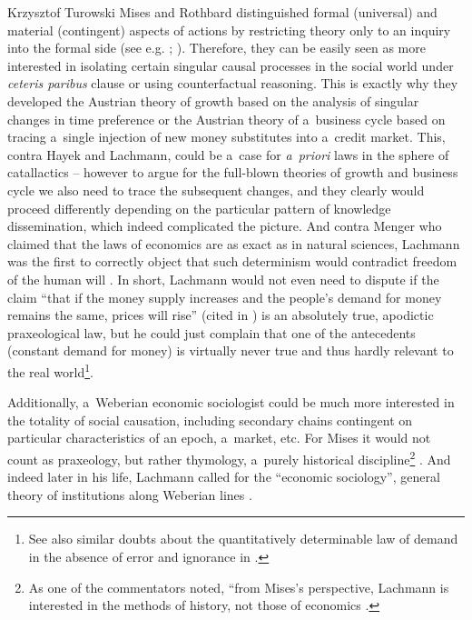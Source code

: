\begin{artengenv}{Krzysztof Turowski}
Mises and Rothbard distinguished formal (universal) and material (contingent) aspects of actions by restricting theory only to an inquiry into the formal side (see e.g. \cite[31--32]{mises-ha}; \cite[83]{rothbard-mes}). Therefore, they can be easily seen as more interested in isolating certain singular causal processes in the social world under \emph{ceteris paribus} clause or using counterfactual reasoning. This is exactly why they developed the Austrian theory of growth based on the analysis of singular changes in time preference or the Austrian theory of a~business cycle based on tracing a~single injection of new money substitutes into a~credit market.
This, contra Hayek and Lachmann, could be a~case for \emph{a~priori} laws in the sphere of catallactics -- however to argue for the full-blown theories of growth and business cycle we also need to trace the subsequent changes, and they clearly would proceed differently depending on the particular pattern of knowledge dissemination, which indeed complicated the picture.
And contra Menger who claimed that the laws of economics are as exact as in natural sciences, Lachmann was the first to correctly object that such determinism would contradict freedom of the human will \parencite[59]{lachmann-menger}.
In short, Lachmann would not even need to dispute if the claim ``that if the money supply increases and the people's demand for money remains the same, prices will rise'' (cited in \cite[52]{rothbard-present}) is an absolutely true, apodictic praxeological law, but he could just complain that one of the antecedents (constant demand for money) is virtually never true and thus hardly relevant to the real world\footnote{See also similar doubts about the quantitatively determinable law of demand in the absence of error and ignorance in \textcite[58]{lachmann-menger}.}.

Additionally, a~Weberian economic sociologist could be much more interested in the totality of social causation, including secondary chains contingent on particular characteristics of an epoch, a~market, etc. For Mises it would not count as praxeology, but rather thymology, a~purely historical discipline\footnote{As one of the commentators noted, ``from Mises's perspective, Lachmann is interested in the methods of history, not those of economics \parencite[37]{parsons}.} \parencite[272--274]{mises-theory}.
And indeed later in his life, Lachmann called for the ``economic sociology'', general theory of institutions along Weberian lines \parencite[277--278,282]{lachmann-hermeneutic}.


\end{artengenv}
